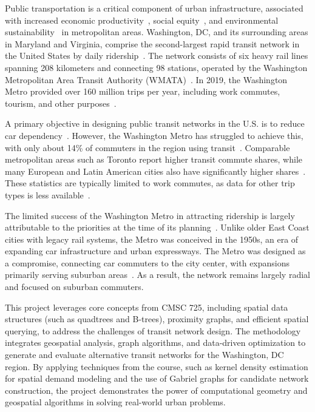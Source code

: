 \documentclass[manuscript]{acmart}
\begin{document}
Public transportation is a critical component of urban infrastructure, associated with increased economic productivity~\cite{lit:us_transit_policy}, social equity~\cite{lit:equity}, and environmental sustainability~\cite{lit:us_transit_policy} in metropolitan areas. Washington, DC, and its surrounding areas in Maryland and Virginia, comprise the second-largest rapid transit network in the United States by daily ridership~\cite{lit:wmata_stats}. The network consists of six heavy rail lines spanning 208 kilometers and connecting 98 stations, operated by the Washington Metropolitan Area Transit Authority (WMATA)~\cite{lit:wmata_stats}. In 2019, the Washington Metro provided over 160 million trips per year, including work commutes, tourism, and other purposes~\cite{lit:wmata_stats}.

A primary objective in designing public transit networks in the U.S. is to reduce car dependency~\cite{lit:us_transit_policy}. However, the Washington Metro has struggled to achieve this, with only about 14\% of commuters in the region using transit~\cite{lit:commute_stats}. Comparable metropolitan areas such as Toronto report higher transit commute shares, while many European and Latin American cities also have significantly higher shares~\cite{lit:toronto}. These statistics are typically limited to work commutes, as data for other trip types is less available~\cite{lit:commute_stats}.

The limited success of the Washington Metro in attracting ridership is largely attributable to the priorities at the time of its planning~\cite{lit:wmata_history}. Unlike older East Coast cities with legacy rail systems, the Metro was conceived in the 1950s, an era of expanding car infrastructure and urban expressways. The Metro was designed as a compromise, connecting car commuters to the city center, with expansions primarily serving suburban areas~\cite{lit:wmata_history}. As a result, the network remains largely radial and focused on suburban commuters.

This project leverages core concepts from CMSC 725, including spatial data structures (such as quadtrees and B-trees), proximity graphs, and efficient spatial querying, to address the challenges of transit network design. The methodology integrates geospatial analysis, graph algorithms, and data-driven optimization to generate and evaluate alternative transit networks for the Washington, DC region. By applying techniques from the course, such as kernel density estimation for spatial demand modeling and the use of Gabriel graphs for candidate network construction, the project demonstrates the power of computational geometry and geospatial algorithms in solving real-world urban problems.
\end{document}
